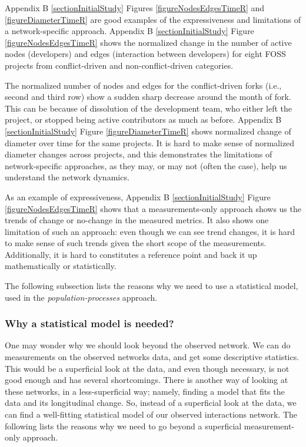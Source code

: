 \documentclass[12pt,letterpaper]{gthesis2}  %
\begin{document}
Appendix B \ref{sectionInitialStudy} Figures \ref{figureNodesEdgesTimeR} and \ref{figureDiameterTimeR} are good examples of the expressiveness and limitations of a network-specific approach. Appendix B \ref{sectionInitialStudy} Figure \ref{figureNodesEdgesTimeR} shows the normalized change in the number of active nodes (developers) and edges (interaction between developers) for eight FOSS projects from conflict-driven and non-conflict-driven categories. 

The normalized number of nodes and edges for the conflict-driven forks (i.e., second and third row) show a sudden sharp decrease around the month of fork. This can be because of dissolution of the development team, who either left the project, or stopped being active contributors as much as before. Appendix B \ref{sectionInitialStudy} Figure \ref{figureDiameterTimeR} shows normalized change of diameter over time for the same projects. It is hard to make sense of normalized diameter changes across projects, and this demonstrates the limitations of network-specific approaches, as they may, or may not (often the case), help us understand the network dynamics.

As an example of expressiveness, Appendix B \ref{sectionInitialStudy} Figure \ref{figureNodesEdgesTimeR} shows that a measurements-only approach shows us the trends of change or no-change in the measured metrics. It also shows one limitation of such an approach: even though we can see trend changes, it is hard to make sense of such trends given the short scope of the measurements. Additionally, it is hard to constitutes a reference point and back it up mathematically or statistically.

The following subsection lists the reasons why we need to use a statistical model, used in the \textit{population-processes} approach.

\subsubsection*{Why a statistical model is needed?}
One may wonder why we should look beyond the observed network. We can do measurements on the observed networks data, and get some descriptive statistics. This would be a superficial look at the data, and even though necessary, is not good enough and has several shortcomings. 
There is another way of looking at these networks, in a less-superficial way; namely, finding a model that fits the data and its longitudinal change. So, instead of a superficial look at the data, we can find a well-fitting statistical model of our observed interactions network. The following lists the reasons why we need to go beyond a superficial measurement-only approach. 
\end{document}
